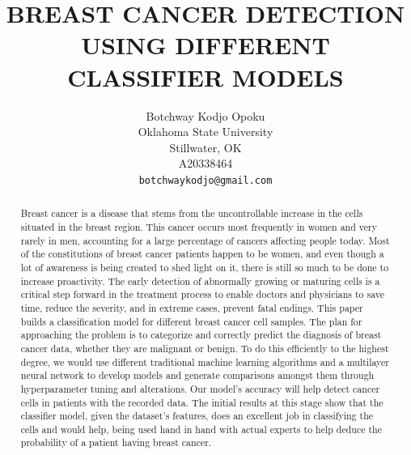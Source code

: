 \documentclass[10pt,twocolumn,letterpaper]{article}
\begin{document}
\title{BREAST CANCER DETECTION USING DIFFERENT CLASSIFIER MODELS}

\author{Botchway Kodjo Opoku\\
Oklahoma State University\\
Stillwater, OK\\
A20338464\\
{\tt\small botchwaykodjo@gmail.com}}
\maketitle

\begin{abstract}
   Breast cancer is a disease that stems from the uncontrollable increase in the cells situated in the breast region. This cancer occurs most frequently in women and very rarely in men, accounting for a large percentage of cancers affecting people today. Most of the constitutions of breast cancer patients happen to be women, and even though a lot of awareness is being created to shed light on it, there is still so much to be done to increase proactivity. The early detection of abnormally growing or maturing cells is a critical step forward in the treatment process to enable doctors and physicians to save time, reduce the severity, and in extreme cases, prevent fatal endings. This paper builds a classification model for different breast cancer cell samples. The plan for approaching the problem is to categorize and correctly predict the diagnosis of breast cancer data, whether they are malignant or benign. To do this efficiently to the highest degree, we would use different traditional machine learning algorithms and a multilayer neural network to develop models and generate comparisons amongst them through hyperparameter tuning and alterations. Our model's accuracy will help detect cancer cells in patients with the recorded data. The initial results at this stage show that the classifier model, given the dataset's features, does an excellent job in classifying the cells and would help, being used hand in hand with actual experts to help deduce the probability of a patient having breast cancer.
\end{abstract}
\end{document}
